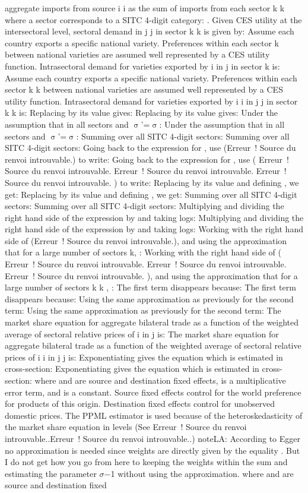 \documentclass[12pt,twoside,a4paper,notitlepage]{article}
\begin{document}
aggregate imports from source i i as the sum of imports from each sector k k where a sector corresponds to a SITC 4-digit category: . Given CES utility at the intersectoral level, sectoral demand in j j in sector k k is given by: Assume each country exports a specific national variety. Preferences within each sector k between national varieties are assumed well represented by a CES utility function. Intrasectoral demand for varieties exported by i in j in sector k is: Assume each country exports a specific national variety. Preferences within each sector k k between national varieties are assumed well represented by a CES utility function. Intrasectoral demand for varieties exported by i i in j j in sector k k is: Replacing by its value gives: Replacing by its value gives: Under the assumption that in all sectors and ${\upsigma}$'=${\upsigma}$: Under the assumption that in all sectors and ${\upsigma}$'=${\upsigma}$: Summing over all SITC 4-digit sectors: Summing over all SITC 4-digit sectors: Going back to the expression for , use (Erreur~! Source du renvoi introuvable.) to write: Going back to the expression for , use ( Erreur~! Source du renvoi introuvable. Erreur~! Source du renvoi introuvable. Erreur~! Source du renvoi introuvable. ) to write: Replacing by its value and defining , we get: Replacing by its value and defining , we get: Summing over all SITC 4-digit sectors: Summing over all SITC 4-digit sectors: Multiplying and dividing the right hand side of the expression by and taking logs: Multiplying and dividing the right hand side of the expression by and taking logs: Working with the right hand side of (Erreur~! Source du renvoi introuvable.), and using the approximation that for a large number of sectors k, : Working with the right hand side of ( Erreur~! Source du renvoi introuvable. Erreur~! Source du renvoi introuvable. Erreur~! Source du renvoi introuvable. ), and using the approximation that for a large number of sectors k k , : The first term disappears because: The first term disappears because: Using the same approximation as previously for the second term: Using the same approximation as previously for the second term: The market share equation for aggregate bilateral trade as a function of the weighted average of sectoral relative prices of i in j is: The market share equation for aggregate bilateral trade as a function of the weighted average of sectoral relative prices of i i in j j is: Exponentiating gives the equation which is estimated in cross-section: Exponentiating gives the equation which is estimated in cross-section: where and are source and destination fixed effects, is a multiplicative error term, and is a constant. Source fixed effects control for the world preference for products of this origin. Destination fixed effects control for unobserved domestic prices. The PPML estimator is used because of the heteroskedasticity of the market share equation in levels (See Erreur~! Source du renvoi introuvable..Erreur~! Source du renvoi introuvable..) noteLA: According to Egger no approximation is needed since weights are directly given by the equality . But I do not get how you go from here to keeping the weights within the sum and estimating the parameter ${\sigma}$${-}$1 without using the approximation. where and are source and destination fixed 
\end{document}
